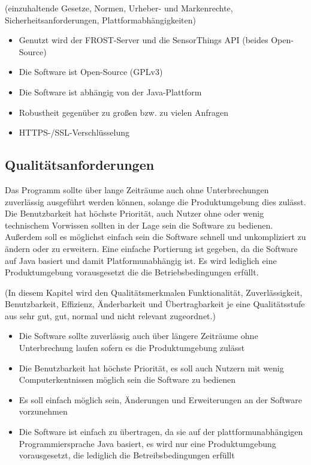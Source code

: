 \documentclass[12 pt]{article}
\begin{document}
(einzuhaltende Gesetze, Normen, Urheber- und Markenrechte,
Sicherheitsanforderungen, Plattformabhängigkeiten)
\begin{itemize}
\item Genutzt wird der FROST-Server und die SensorThings API (beides Open-Source)
\item Die Software ist Open-Source (GPLv3)
\item Die Software ist abhängig von der Java-Plattform
\item Robustheit gegenüber zu großen bzw. zu vielen Anfragen 		
\item HTTPS-/SSL-Verschlüsselung								
\end{itemize}


\subsection{Qualitätsanforderungen}
Das Programm sollte über lange Zeiträume auch ohne Unterbrechungen zuverlässig ausgeführt werden können, solange die Produktumgebung dies zulässt.
Die Benutzbarkeit hat höchste Priorität, auch Nutzer ohne oder wenig technischem Vorwissen sollten in der Lage sein die Software zu bedienen.
Außerdem soll es möglichst einfach sein die Software schnell und unkompliziert zu ändern oder zu erweitern.
Eine einfache Portierung ist gegeben, da die Software auf Java basiert und damit Platformunabhängig ist. Es wird lediglich eine Produktumgebung vorausgesetzt die die Betriebsbedingungen erfüllt.

(In diesem Kapitel wird den Qualitätsmerkmalen Funktionalität, Zuverlässigkeit, Benutzbarkeit, Effizienz, Änderbarkeit und Übertragbarkeit je eine Qualitätsstufe aus sehr gut, gut, normal und nicht relevant zugeordnet.)
\begin{itemize}
\item Die Software sollte zuverlässig auch über längere Zeiträume ohne Unterbrechung laufen sofern es die Produktumgebung zulässt
\item Die Benutzbarkeit hat höchste Priorität, es soll auch Nutzern mit wenig Computerkentnissen möglich sein die Software zu bedienen
\item Es soll einfach möglich sein, Änderungen und Erweiterungen an der Software vorzunehmen
\item Die Software ist einfach zu übertragen, da sie auf der plattformunabhängigen Programmiersprache Java basiert, es wird nur eine Produktumgebung vorausgesetzt, die lediglich die Betreibsbedingungen erfüllt
\end{itemize}
\end{document}
